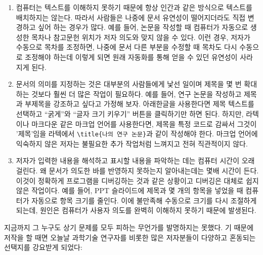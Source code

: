 \documentclass[
  letterpaper,
]{book}
\begin{document}
\begin{enumerate}
\def\labelenumi{\arabic{enumi}.}
\item
  컴퓨터는 텍스트를 이해하지 못하기 때문에 항상 인간과 같은 방식으로
  텍스트를 배치하지는 않는다. 따라서 사람들은 나중에 문서 유연성이
  떨어지더라도 직접 변경하고 싶어 하는 경우가 많다. 예를 들어, 논문을
  작성할 때 컴퓨터가 자동으로 생성한 목차나 참고문헌 위치가 저자 의도와
  맞지 않을 수 있다. 이런 경우, 저자가 수동으로 목차를 조정하면, 나중에
  문서 다른 부분을 수정할 때 목차도 다시 수동으로 조정해야 하는데 이렇게
  되면 원래 자동화를 통해 얻을 수 있던 유연성이 사라지게 된다.
\item
  문서의 의미를 지정하는 것은 대부분의 사람들에게 낯선 일이며 제목을 몇
  번 확대하는 것보다 훨씬 더 많은 작업이 필요하다. 예를 들어, 연구
  논문을 작성하고 제목과 부제목을 강조하고 싶다고 가정해 보자.
  아래한글을 사용한다면 제목 텍스트를 선택하고 ``굵게''와 ``글자 크기
  키우기'' 버튼을 클릭하기만 하면 된다. 하지만, 라텍이나 마크다운 같은
  마크업 언어를 사용한다면, 제목을 특정 코드로 감싸서 그것이 '제목'임을
  라텍에서 \texttt{\textbackslash{}title\{나의\ 연구\ 논문\}}과 같이
  작성해야 한다. 마크업 언어에 익숙하지 않은 저자는 불필요한 추가
  작업처럼 느껴지고 전혀 직관적이지 않다.
\item
  저자가 입력한 내용을 해석하고 표시할 내용을 파악하는 데는 컴퓨터
  시간이 오래 걸린다. 왜 문서가 의도한 바를 반영하지 못하는지
  알아내는데는 몇배 시간이 든다. 이것이 정확하게 프로그램을 디버깅하는
  것과 같은 상황이고 디버깅은 대체로 쉽지 않은 작업이다. 예를 들어, PPT
  슬라이드에 제목과 몇 개의 항목을 넣었을 때 컴퓨터가 자동으로 항목
  크기를 줄인다. 이에 불만족해 수동으로 크기를 다시 조절하게 되는데,
  원인은 컴퓨터가 사용자 의도를 완벽히 이해하지 못하기 때문에 발생된다.
\end{enumerate}

지금까지 그 누구도 상기 문제를 모두 피하는 무언가를 발명하지는 못했다.
기 때문에 저작을 할 때면 오늘날 과학기술 연구자를 비롯한 많은 저자분들이
다양하고 혼동되는 선택지를 강요받게 되었다:
\end{document}
